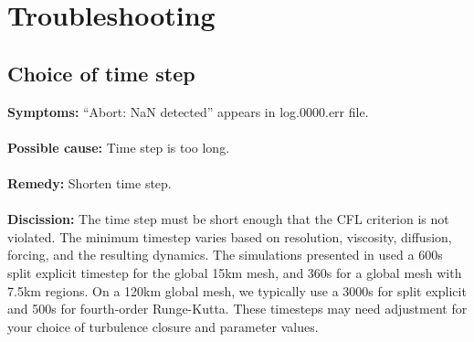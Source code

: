 \chapter{Troubleshooting}
\label{chap:troubleshooting}

\section{Choice of time step}

{\bf Symptoms:} ``Abort: NaN detected'' appears in log.0000.err file.
\\ \\
{\bf Possible cause:} Time step is too long.
\\ \\
{\bf Remedy:}  Shorten time step.  
\\ \\
{\bf Discission:}  The time step must be short enough that the CFL criterion is not violated.  The minimum timestep varies based on resolution, viscosity, diffusion, forcing, and the resulting dynamics.  The simulations presented in \citet{Ringler_ea13om} used a 600s split explicit timestep for the global 15km mesh, and 360s for a global mesh with 7.5km regions.  On a 120km global mesh, we typically use a 3000s for split explicit and 500s for fourth-order Runge-Kutta.  These timesteps may need adjustment for your choice of turbulence closure and parameter values.



